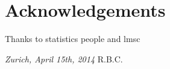 \chapter*{Acknowledgements}

%
%
%
Thanks to statistics people and lmsc
\lipsum[12]

\bigskip
 
\noindent\textit{Zurich, April 15th, 2014}
\hfill R.B.C.
